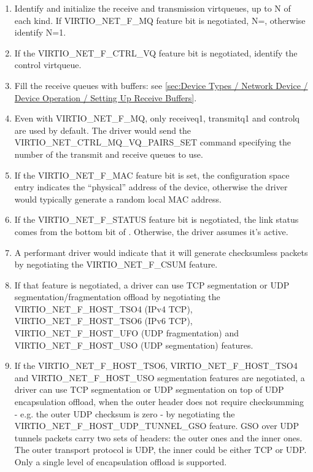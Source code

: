 \begin{enumerate}
\item Identify and initialize the receive and
  transmission virtqueues, up to N of each kind. If
  VIRTIO_NET_F_MQ feature bit is negotiated,
  N=, otherwise identify N=1.

\item If the VIRTIO_NET_F_CTRL_VQ feature bit is negotiated,
  identify the control virtqueue.

\item Fill the receive queues with buffers: see \ref{sec:Device Types / Network Device / Device Operation / Setting Up Receive Buffers}.

\item Even with VIRTIO_NET_F_MQ, only receiveq1, transmitq1 and
  controlq are used by default.  The driver would send the
  VIRTIO_NET_CTRL_MQ_VQ_PAIRS_SET command specifying the
  number of the transmit and receive queues to use.

\item If the VIRTIO_NET_F_MAC feature bit is set, the configuration
  space  entry indicates the ``physical'' address of the
  device, otherwise the driver would typically generate a random
  local MAC address.

\item If the VIRTIO_NET_F_STATUS feature bit is negotiated, the link
  status comes from the bottom bit of .
  Otherwise, the driver assumes it's active.

\item A performant driver would indicate that it will generate checksumless
  packets by negotiating the VIRTIO_NET_F_CSUM feature.

\item If that feature is negotiated, a driver can use TCP segmentation or UDP
  segmentation/fragmentation offload by negotiating the VIRTIO_NET_F_HOST_TSO4 (IPv4
  TCP), VIRTIO_NET_F_HOST_TSO6 (IPv6 TCP), VIRTIO_NET_F_HOST_UFO
  (UDP fragmentation) and VIRTIO_NET_F_HOST_USO (UDP segmentation) features.

\item If the VIRTIO_NET_F_HOST_TSO6, VIRTIO_NET_F_HOST_TSO4 and VIRTIO_NET_F_HOST_USO
  segmentation features are negotiated, a driver can
  use TCP segmentation or UDP segmentation on top of UDP encapsulation
  offload, when the outer header does not require checksumming - e.g.
  the outer UDP checksum is zero - by negotiating the
  VIRTIO_NET_F_HOST_UDP_TUNNEL_GSO feature.
  GSO over UDP tunnels packets carry two sets of headers: the outer ones
  and the inner ones. The outer transport protocol is UDP, the inner
  could be either TCP or UDP. Only a single level of encapsulation
  offload is supported.


\end{enumerate}
